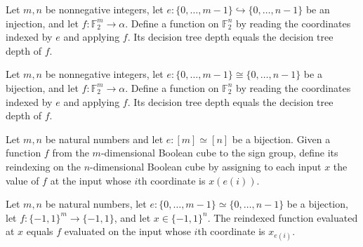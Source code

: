 \begin{theorem}
\leanok
{}
Let $m,n$ be nonnegative integers, let
$e:\{0,\ldots,m-1\}\hookrightarrow\{0,\ldots,n-1\}$ be an injection, and let $f:\mathbb
F_2^m\to\alpha$. Define a function on $\mathbb F_2^n$ by reading the coordinates indexed
by $e$ and applying $f$. Its decision tree depth equals the decision tree depth of $f$.
\end{theorem}

\begin{theorem}
\leanok
{}
Let $m,n$ be nonnegative integers, let $e:\{0,\ldots,m-1\}\cong\{0,\ldots,n-1\}$ be a
bijection, and let $f:\mathbb F_2^m\to\alpha$. Define a function on $\mathbb F_2^n$ by
reading the coordinates indexed by $e$ and applying $f$. Its decision tree depth equals
the decision tree depth of $f$.
\end{theorem}

\begin{definition}
\label{FABL.reindexBooleanFunction}
\leanok
{}
Let $m,n$ be natural numbers and let $e:[m]\simeq[n]$ be a bijection. Given a function
$f$ from the $m$-dimensional Boolean cube to the sign group, define its reindexing on
the $n$-dimensional Boolean cube by assigning to each input $x$ the value of $f$ at the
input whose $i$th coordinate is $x(e(i))$.
\end{definition}

\begin{theorem}
\label{FABL.reindexBooleanFunction_apply}
\leanok
{}
Let $m,n$ be natural numbers, let $e\colon\{0,\ldots,m-1\}\simeq\{0,\ldots,n-1\}$ be a
bijection, let $f\colon\{-1,1\}^m\to\{-1,1\}$, and let $x\in\{-1,1\}^n$. The reindexed
function evaluated at $x$ equals $f$ evaluated on the input whose $i$th coordinate is
$x_{e(i)}$.
\end{theorem}

